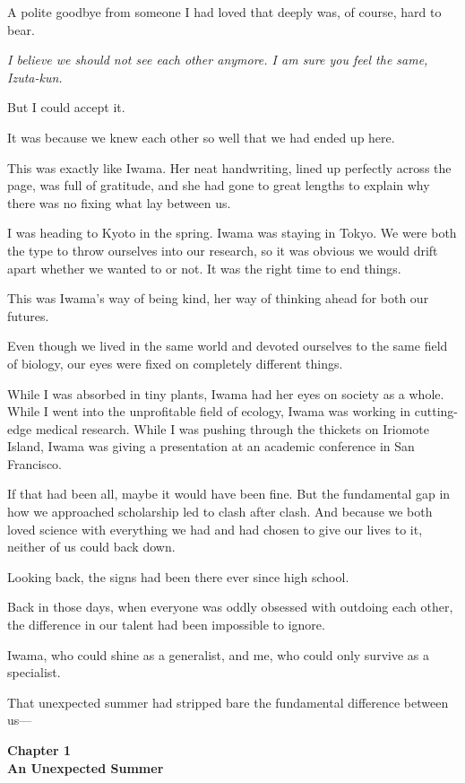 \documentclass[
    a4paper,
    12pt,
    twoside,
    openany,
    UTF8,
    fontset=windows
]{ctexbook}
\begin{document}
A polite goodbye from someone I had loved that deeply was, of course, hard to bear.

\textit{I believe we should not see each other anymore. I am sure you feel the same, Izuta-kun.}

But I could accept it.

It was because we knew each other so well that we had ended up here.

This was exactly like Iwama. Her neat handwriting, lined up perfectly across the page, was full of gratitude, and she had gone to great lengths to explain why there was no fixing what lay between us.

I was heading to Kyoto in the spring. Iwama was staying in Tokyo. We were both the type to throw ourselves into our research, so it was obvious we would drift apart whether we wanted to or not. It was the right time to end things.

This was Iwama's way of being kind, her way of thinking ahead for both our futures.

Even though we lived in the same world and devoted ourselves to the same field of biology, our eyes were fixed on completely different things.

While I was absorbed in tiny plants, Iwama had her eyes on society as a whole.
While I went into the unprofitable field of ecology, Iwama was working in cutting-edge medical research.
While I was pushing through the thickets on Iriomote Island, Iwama was giving a presentation at an academic conference in San Francisco.

If that had been all, maybe it would have been fine. But the fundamental gap in how we approached scholarship led to clash after clash. And because we both loved science with everything we had and had chosen to give our lives to it, neither of us could back down.

Looking back, the signs had been there ever since high school.

Back in those days, when everyone was oddly obsessed with outdoing each other, the difference in our talent had been impossible to ignore.

Iwama, who could shine as a generalist, and me, who could only survive as a specialist.

That unexpected summer had stripped bare the fundamental difference between us---

\clearpage
\thispagestyle{plain}
\begin{center}
    \large\bfseries
    Chapter 1\\
    An Unexpected Summer
\end{center}
\label{sec:ch1V3}
\vspace{1cm}
\end{document}
